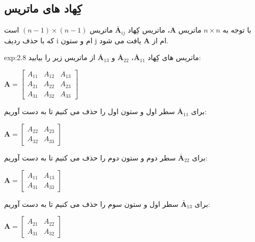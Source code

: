 \subsection{\textbf{کِهاد های ماتریس}}
{
    \Large
    \begin{spacing}{1.5}
        با توجه به $n\times n$ ماتریس $\textbf{A}$، ماتریس کِهاد $\bar{\textbf{A}}_{ij}$ ماتریس $(n-1)\times (n-1)$ است که با حذف ردیف i ام و ستون j ام از $\textbf{A}$ یافت می شود.

        \begin{example}{exp:2.8}
            \Large
            ماتریس های کِهاد $\bar{\textbf{A}}_{11}$، $\bar{\textbf{A}}_{22}$ و $\bar{\textbf{A}}_{13}$ از ماتریس زیر را بیابید:

            \begin{center}
                $\textbf{A}=\begin{bmatrix}
                                A_{11} & A_{12} & A_{13} \\
                                A_{21} & A_{22} & A_{23} \\
                                A_{31} & A_{32} & A_{33}
                \end{bmatrix}$
            \end{center}

            برای $\bar{\textbf{A}}_{11}$ سطر اول و ستون اول را حذف می کنیم تا به دست آوریم:

            \begin{center}
                $\textbf{A}=\begin{bmatrix}
                                A_{22} & A_{23} \\
                                A_{32} & A_{33}
                \end{bmatrix}$
            \end{center}

            برای $\bar{\textbf{A}}_{22}$ سطر دوم و ستون دوم را حذف می کنیم تا به دست آوریم:

            \begin{center}
                $\textbf{A}=\begin{bmatrix}
                                A_{11} & A_{13} \\
                                A_{31} & A_{33}
                \end{bmatrix}$
            \end{center}

            برای $\bar{\textbf{A}}_{13}$ سطر اول و ستون سوم را حذف می کنیم تا به دست آوریم:

            \begin{center}
                $\textbf{A}=\begin{bmatrix}
                                A_{21} & A_{22} \\
                                A_{31} & A_{32}
                \end{bmatrix}$
            \end{center}
        \end{example}
    \end{spacing}
}

